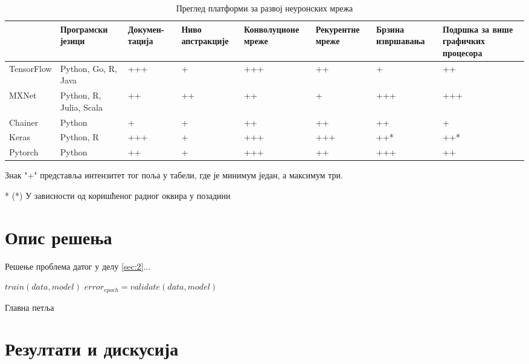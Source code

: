 \documentclass[a4paper, 12pt, master, utf8]{etf}
\begin{document}
\begin{table}
    \centering
    \begin{tabular}{|l | P{2.5cm} | P{2.2cm} | P{2cm} | P{2.5cm} | P{2cm} | P{1.5cm} | P{3.5cm}|}
        \hline
            & Програмски језици & Докумен- тација & Ниво апстракције & Конволуционе мреже & Рекурентне мреже & Брзина извршавања & Подршка за више графичких процесора\\
        \hline
         TensorFlow & Python, Go, R, Java & +++ & + & +++ & ++ & + & ++ \\\hline
         MXNet & Python, R, Julia, Scala & ++ & ++ & ++ & + & +++ & +++ \\\hline
         Chainer & Python & + & + & ++ & ++ & ++ & +\\\hline
         Keras & Python, R & +++ & + & +++ & +++ & ++* & ++*\\\hline
         Pytorch & Python & ++ & + & +++ & ++ & +++ & ++\\\hline
    \end{tabular}
    \begin{tablenotes}
        \small
        \item Знак "+" представља интензитет тог поља у табели, где је минимум један, а максимум три.
        \item[*] (*) У зависности од коришћеног радног оквира у позадини
    \end{tablenotes}
    \caption{Преглед платформи за развој неуронских мрежа}
    \label{tab:platforms}
\end{table}

\chapter{Опис решења}
\label{sec:4}

Решење проблема датог у делу \ref{sec:2}...

\begin{algorithm}
\label{alg1}
\DontPrintSemicolon
{} {
    $train(data, model)$ \;
    $error_{epoch} = validate(data, model)$ \;
}
 \caption{Главна петља}
\end{algorithm}

\chapter{Резултати и дискусија}
\label{sec:5}
\end{document}
